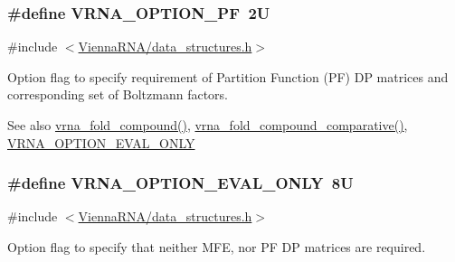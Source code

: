 \subsubsection[{\texorpdfstring{V\+R\+N\+A\+\_\+\+O\+P\+T\+I\+O\+N\+\_\+\+PF}{VRNA_OPTION_PF}}]{\setlength{\rightskip}{0pt plus 5cm}\#define V\+R\+N\+A\+\_\+\+O\+P\+T\+I\+O\+N\+\_\+\+PF~2U}\hypertarget{group__fold__compound_gabfbadcddda3e74ce7f49035ef8f058f7}{}\label{group__fold__compound_gabfbadcddda3e74ce7f49035ef8f058f7}


{\ttfamily \#include $<$\hyperlink{data__structures_8h}{Vienna\+R\+N\+A/data\+\_\+structures.\+h}$>$}



Option flag to specify requirement of Partition Function (PF) DP matrices and corresponding set of Boltzmann factors. 

\begin{DoxySeeAlso}{See also}
\hyperlink{group__fold__compound_ga6601d994ba32b11511b36f68b08403be}{vrna\+\_\+fold\+\_\+compound()}, \hyperlink{group__fold__compound_gad6bacc816af274922b13d947f708aa0c}{vrna\+\_\+fold\+\_\+compound\+\_\+comparative()}, \hyperlink{group__fold__compound_ga61469c423131552c8483229f8b6c7e0e}{V\+R\+N\+A\+\_\+\+O\+P\+T\+I\+O\+N\+\_\+\+E\+V\+A\+L\+\_\+\+O\+N\+LY} 
\end{DoxySeeAlso}
\subsubsection[{\texorpdfstring{V\+R\+N\+A\+\_\+\+O\+P\+T\+I\+O\+N\+\_\+\+E\+V\+A\+L\+\_\+\+O\+N\+LY}{VRNA_OPTION_EVAL_ONLY}}]{\setlength{\rightskip}{0pt plus 5cm}\#define V\+R\+N\+A\+\_\+\+O\+P\+T\+I\+O\+N\+\_\+\+E\+V\+A\+L\+\_\+\+O\+N\+LY~8U}\hypertarget{group__fold__compound_ga61469c423131552c8483229f8b6c7e0e}{}\label{group__fold__compound_ga61469c423131552c8483229f8b6c7e0e}


{\ttfamily \#include $<$\hyperlink{data__structures_8h}{Vienna\+R\+N\+A/data\+\_\+structures.\+h}$>$}



Option flag to specify that neither M\+FE, nor PF DP matrices are required. 


